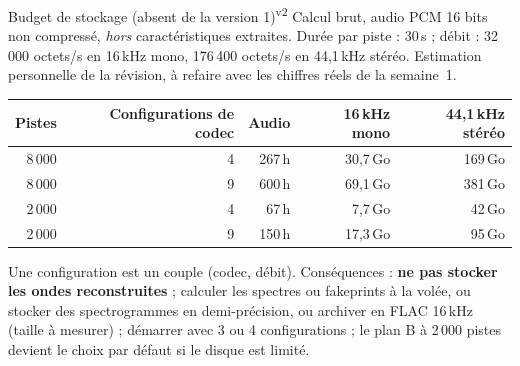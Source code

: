 \documentclass[11pt,a4paper]{article}
\newcommand{\vtwot}{\textsuperscript{v2}}  %
\begin{document}
\begin{corr}{Budget de stockage (absent de la version 1)\vtwot}
Calcul brut, audio PCM 16 bits non compressé, \emph{hors} caractéristiques extraites. Durée par piste : 30\,s ; débit : 32\,000 octets/s en 16\,kHz mono, 176\,400 octets/s en 44,1\,kHz stéréo. Estimation personnelle de la révision, à refaire avec les chiffres réels de la semaine~1.

\begin{center}
\small
\begin{tabular}{rrrrr}
\toprule
\textbf{Pistes} & \textbf{Configurations de codec} & \textbf{Audio} & \textbf{16\,kHz mono} & \textbf{44,1\,kHz stéréo}\\
\midrule
8\,000 & 4 & 267\,h & 30,7\,Go & 169\,Go\\
8\,000 & 9 & 600\,h & 69,1\,Go & 381\,Go\\
2\,000 & 4 & 67\,h & 7,7\,Go & 42\,Go\\
2\,000 & 9 & 150\,h & 17,3\,Go & 95\,Go\\
\bottomrule
\end{tabular}
\end{center}
Une configuration est un couple (codec, débit). Conséquences : \textbf{ne pas stocker les ondes reconstruites} ; calculer les spectres ou fakeprints à la volée, ou stocker des spectrogrammes en demi-précision, ou archiver en FLAC 16\,kHz (taille à mesurer) ; démarrer avec 3 ou 4 configurations ; le plan B à 2\,000 pistes devient le choix par défaut si le disque est limité.
\end{corr}
\end{document}
